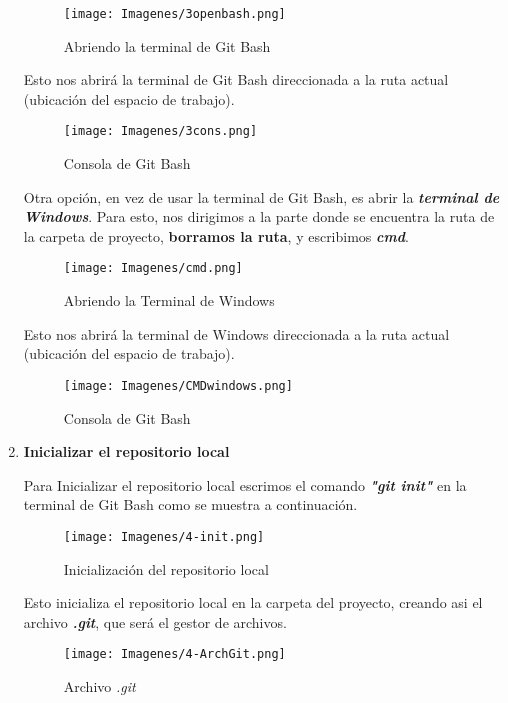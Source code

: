 \begin{enumerate}
        \begin{figure}[H]
            \centering
            \texttt{[image: Imagenes/3openbash.png]}
            \caption{Abriendo la terminal de Git Bash}
            \label{}
        \end{figure}

        Esto nos abrirá la terminal de Git Bash direccionada a la ruta actual (ubicación del espacio de trabajo).
        
        \begin{figure}[H]
            \centering
            \texttt{[image: Imagenes/3cons.png]}
            \caption{Consola de Git Bash}
            \label{}
        \end{figure}

        Otra opción, en vez de usar la terminal de Git Bash, es abrir la \textit{\textbf{terminal de Windows}}. Para esto, nos dirigimos a la parte donde se encuentra la ruta de la carpeta de proyecto, \textbf{borramos la ruta}, y escribimos \textbf{\textit{cmd}}.
            
        \begin{figure}[H]
            \centering
            \texttt{[image: Imagenes/cmd.png]}
            \caption{Abriendo la Terminal de Windows}
            \label{}
        \end{figure}
        
        Esto nos abrirá la terminal de Windows direccionada a la ruta actual (ubicación del espacio de trabajo).
        
        \begin{figure}[H]
            \centering
            \texttt{[image: Imagenes/CMDwindows.png]}
            \caption{Consola de Git Bash}
            \label{}
        \end{figure}

    \item \textbf{Inicializar el repositorio local}
    
    Para Inicializar el repositorio local escrimos el comando \textit{\textbf{"git init"}} en la terminal de Git Bash como se muestra a continuación.
    
        \begin{figure}[H]
            \centering
            \texttt{[image: Imagenes/4-init.png]}
            \caption{Inicialización del repositorio local}
            \label{}
        \end{figure}
        
        Esto inicializa el repositorio local en la carpeta del proyecto, creando asi el archivo \textbf{\textit{.git}}, que será el gestor de archivos.

        \begin{figure}[H]
            \centering
            \texttt{[image: Imagenes/4-ArchGit.png]}
            \caption{Archivo \textit{.git}}
            \label{}
        \end{figure}

\end{enumerate}

